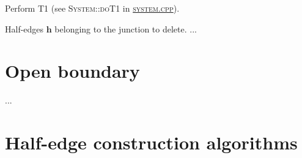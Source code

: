 \documentclass[aps, superscriptaddress, notitlepage]{revtex4-1}
\begin{document}
\begin{algorithm}[H]
\caption{Perform T1 (see \textsc{System::doT1} in \href{../system.cpp}{\textsc{system.cpp}}).}
\label{alg:t1}
\begin{algorithmic}[1]
\REQUIRE Half-edges $\boldsymbol{h}$ belonging to the junction to delete.
\STATE ...
\end{algorithmic}
\end{algorithm}

\section{Open boundary}

...

% 

\appendix

\newpage
\section{Half-edge construction algorithms}
\end{document}
